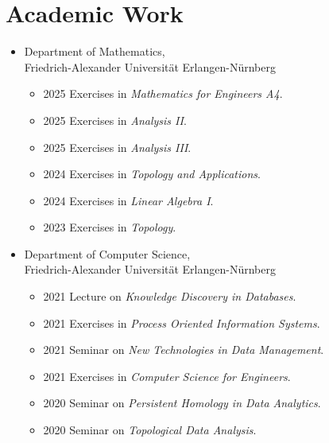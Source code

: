 \documentclass[a4paper, 11pt]{article}
\newcommand{\years}[1]{\marginnote{\scriptsize #1}}
\begin{document}
	\newpage
	\section*{Academic Work}
	\years{Teaching}
	\vspace{-2pt}
	\begin{itemize}[noitemsep, leftmargin=*]
		\item Department of Mathematics, \\ Friedrich-Alexander Universität Erlangen-Nürnberg
			\begin{itemize}
				\item 2025 Exercises in \emph{Mathematics for Engineers A4}.

				\item 2025 Exercises in \emph{Analysis II}.

				\item 2025 Exercises in \emph{Analysis III}.

				\item 2024 Exercises in \emph{Topology and Applications}.

				\item 2024 Exercises in \emph{Linear Algebra I}.

				\item 2023 Exercises in \emph{Topology}.
			\end{itemize}

		\item Department of Computer Science, \\ Friedrich-Alexander Universität
			Erlangen-Nürnberg
			\begin{itemize}
				\item 2021 Lecture on \emph{Knowledge Discovery in Databases}.

				\item 2021 Exercises in \emph{Process Oriented Information Systems}.

				\item 2021 Seminar on \emph{New Technologies in Data Management}.

				\item 2021 Exercises in \emph{Computer Science for Engineers}.

				\item 2020 Seminar on \emph{Persistent Homology in Data Analytics}.

				\item 2020 Seminar on \emph{Topological Data Analysis}.


\end{itemize}
\end{itemize}
\end{document}
